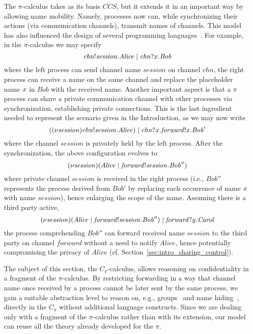 The $\pi$-calculus takes as its basis $CCS$, but it extends it in an important way by allowing name mobility.  Namely, processes now can, while synchronizing their actions (via communication channels), transmit names of channels. This model has also influenced the design of several programming languages~\cite{ DBLP:conf/afp/FournetFMS02, DBLP:journals/entcs/MeredithR05,  DBLP:conf/birthday/PierceT00, DBLP:journals/jfp/SewellLWNAHV07,DBLP:conf/wecwis/ThiagarajanSPB02,DBLP:conf/birthday/WelchB04}. For example, in the $\pi$-calculus we may specify 
\[
\mathit{chn}!\mathit{session}.\mathit{Alice} \;|\; \mathit{chn}?x.\mathit{Bob}
\]
where the left process can send channel name $\mathit{session}$ on channel $\mathit{chn}$, the right process can receive a name on the same channel and replace the placeholder name $x$ in $\mathit{Bob}$ with the received name. 
Another important aspect is that a $\pi$ process can share a private communication channel with other processes via synchronization, establishing private connections. 
This is the last ingredient needed to represent the scenario given in the Introduction, as we may now write
\[
((\nu \mathit{session})\mathit{chn}!\mathit{session}.\mathit{Alice}) \;|\; \mathit{chn}?x.\mathit{forward}!x.\mathit{Bob}'
\]
where the channel $\mathit{session}$ is privately held by the left process. After the synchronization, the above configuration evolves to 
\[
(\nu \mathit{session})(\mathit{Alice} \;|\; \mathit{forward}!\mathit{session}.\mathit{Bob}'')
\]
where private channel $\mathit{session}$ is received in the right process (i.e., $\mathit{Bob}''$ represents the process derived from $\mathit{Bob}'$ by replacing each occurrence of name $x$ with name $\mathit{session}$), hence enlarging the scope of the name. Assuming there is a third party active,
\[
(\nu \mathit{session})(\mathit{Alice} \;|\; \mathit{forward}!\mathit{session}.\mathit{Bob}'') \;|\; \mathit{forward}?y.\mathit{Carol}
\]
 the process comprehending $\mathit{Bob}''$ can forward received name $\mathit{session}$ to the third party on channel $\mathit{forward}$ without a need to notify $\mathit{Alice}$, hence potentially compromising the privacy of $\mathit{Alice}$ (cf. Section~\ref{sec:intro_sharing_control}). 


The subject of this section, the $C_\pi$-calculus, allows reasoning on confidentiality in a fragment of the $\pi$-calculus. 
By restricting forwarding in a way that channel name once received by a process cannot be later sent by the same process, we gain a suitable abstraction level to reason on, e.g., groups~\cite{cardelli05} and name hiding~\cite{Giunti}, directly in the $C_\pi$ without additional language constructs. Since we are dealing only with a fragment of the $\pi$-calculus rather than with its extension, our model can reuse all the theory already developed for the $\pi$.

